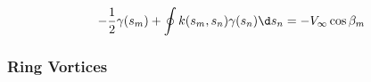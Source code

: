 \begin{equation}
\label{eqn:fredholmintegral}
	-\frac{1}{2}\gamma(s_m) + \oint k(s_m, s_n) \gamma(s_n) \d s_n = - V_\infty \cos \beta_m
\end{equation}


\subsubsection{Ring Vortices}

%
%
%
%
%
%
%
%
%
%
%
%
%
